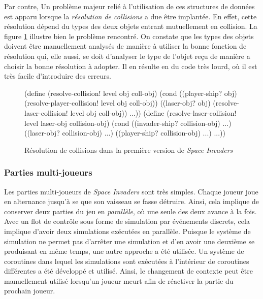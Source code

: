 \documentclass[12pt,twoside,letterpaper,francais]{book}
\newcommand{\si}{{\textit{Space Invaders }}}
\begin{document}
Par contre, Un problème majeur relié à l'utilisation de ces structures
de données est apparu lorsque la \emph{résolution de collisions} a due
être implantée. En effet, cette résolution dépend du types des deux
objets entrant mutuellement en collision. La figure
\ref{Exp:si1-col-res} illustre bien le problème rencontré. On constate
que les types des objets doivent être manuellement analysés de manière
à utiliser la bonne fonction de résolution qui, elle aussi, se doit
d'analyser le type de l'objet reçu de manière a choisir la bonne
résolution à adopter. Il en résulte en du code très lourd, où il est
très facile d'introduire des erreurs.

\begin{figure}[htb!]
  \begin{schemecode}
(define (resolve-collision! level obj coll-obj)
  (cond
   ((player-ship? obj) (resolve-player-collision! level obj coll-obj))
   ((laser-obj? obj) (resolve-laser-collision! level obj coll-obj))
   ...))
(define (resolve-laser-collision! level laser-obj collision-obj)
  (cond ((invader-ship? collision-obj) ...)
        ((laser-obj? collision-obj) ...)
        ((player-ship? collision-obj) ...)
        ...))
  \end{schemecode}
  \caption{Résolution de collisions dans la première version de \si}
  \label{Exp:si1-col-res}
\end{figure}


\FloatBarrier
\subsubsection{Parties multi-joueurs}
Les parties multi-joueurs de \si sont très simples. Chaque joueur joue
en alternance jusqu'à se que son vaisseau se fasse détruire. Ainsi,
cela implique de conserver deux parties du jeu en \emph{parallèle}, où
une seule des deux avance à la fois. Avec un flot de contrôle sous
forme de simulation par événements discrets, cela implique d'avoir
deux simulations exécutées en parallèle. Puisque le système de
simulation ne permet pas d'arrêter une simulation et d'en avoir une
deuxième se produisant en même temps, une autre approche a été
utilisée. Un système de coroutines dans lequel les simulations sont
exécutées à l'intérieur de coroutines différentes a été développé et
utilisé. Ainsi, le changement de contexte peut être manuellement
utilisé lorsqu'un joueur meurt afin de réactiver la partie du prochain
joueur.
\end{document}
